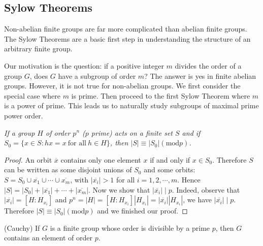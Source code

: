 \subsection{Sylow Theorems}
Non-abelian finite groups are far more complicated than abelian finite groups. The Sylow Theorems are a basic first step in understanding the structure of an arbitrary finite group.\par
Our motivation is the question: if a positive integer $m$ divides the order of a group $G$, does $G$ have a subgroup of order $m$? The answer is yes in finite abelian groups. However, it is not true for non-abelian groups. We first consider the special case where $m$ is prime. Then proceed to the first Sylow Theorem where $m$ is a power of prime. This leads us to naturally study subgroups of maximal prime power order.
\begin{lemma}\em
If a group $H$ of order $p^n$ ($p$ prime) acts on a finite set $S$ and if $S_0=\{x\in S:hx=x\ \text{for all}\ h\in H\}$, then $|S|\equiv|S_0|(\mathrm{mod} p)$.
\end{lemma}
\begin{proof}
An orbit $\overline{x}$ contains only one element $x$ if and only if $x\in S_0$. Therefore $S$ can be written as some disjoint unions of $S_0$ and some orbits: $S=S_0\cup \overline{x_1}\cup \cdots \cup \overline{x_m}$, with $|\overline{x_i}|>1$ for all $i=1,2,\cdots,m$. Hence $\left| S \right|=\left| S_0 \right|+\left| \overline{x_1} \right|+\cdots +\left| \overline{x_m} \right|$. Now we show that $|\overline{x_i}|\mid p$. Indeed, observe that $\left| \overline{x_i} \right|=\left[ H:H_{x_i} \right] $ and $p^n=\left| H \right|=\left[ H:H_{x_i} \right] \left| H_{x_i} \right|=\left| \overline{x_i} \right|\left| H_{x_i} \right|$, we have $|\overline{x_i}|\mid p$. Therefore $\left| S \right|\equiv \left| S_0 \right|\left( \mathrm{mod} p \right) $ and we finished our proof.
\end{proof}
\begin{theorem}(Cauchy)
If $G$ is a finite group whose order is divisible by a prime $p$, then $G$ contains an element of order $p$.
\end{theorem}
